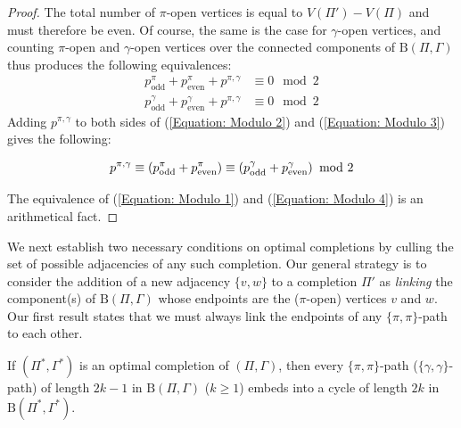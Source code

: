 \begin{proof}
The total number of $\pi$-open vertices is equal to $V(\Pi') - V(\Pi)$ and must therefore be even.  Of course, the same is the case for $\gamma$-open vertices, and counting $\pi$-open and $\gamma$-open vertices over the connected components of $\mathrm{B}(\Pi, \Gamma)$ thus produces the following equivalences:
\begin{align}
p^{\pi}_{\mathrm{odd}} + p^{\pi}_{\mathrm{even}} +  p^{\pi, \gamma} & \equiv 0 \mod 2 \label{Equation: Modulo 2}\\
p^{\gamma}_{\mathrm{odd}} + p^{\gamma}_{\mathrm{even}} + p^{\pi, \gamma} & \equiv 0 \mod 2 \label{Equation: Modulo 3}
\end{align}
Adding $p^{\pi, \gamma}$ to both sides of (\ref{Equation: Modulo 2}) and (\ref{Equation: Modulo 3}) gives the following:

\begin{equation}
p^{\pi, \gamma} \equiv \left(p^{\pi}_{\mathrm{odd}} + p^{\pi}_{\mathrm{even}}\right) \hspace{0 pt} \equiv  \left(p^{\gamma}_{\mathrm{odd}} + p^{\gamma}_{\mathrm{even}}\right) \hspace{-3 pt} \mod 2
\label{Equation: Modulo 4}
\end{equation}

\noindent The equivalence of (\ref{Equation: Modulo 1}) and (\ref{Equation: Modulo 4}) is an arithmetical fact. 
\end{proof}

We next establish two necessary conditions on optimal completions by culling the set of possible adjacencies of any such completion.  Our general strategy is to consider the addition of a new adjacency $\{v, w\}$ to a completion $\Pi'$ as {\em linking} the component(s) of $\mathrm{B}(\Pi, \Gamma)$ whose endpoints are the ($\pi$-open) vertices $v$ and $w$.  Our first result states that we must always link the endpoints of any $\{\pi, \pi\}$-path to each other.

\begin{lemma}
If $(\Pi^*, \Gamma^*)$ is an optimal completion of $(\Pi, \Gamma)$, then every $\{\pi, \pi\}$-path ($\{\gamma, \gamma\}$-path) of length $2k-1$ in $\mathrm{B}(\Pi, \Gamma)$ ($k \geq 1$) embeds into a cycle of length $2k$ in $\mathrm{B}(\Pi^*, \Gamma^*)$.
\label{Lemma: Odd Paths}
\end{lemma}

